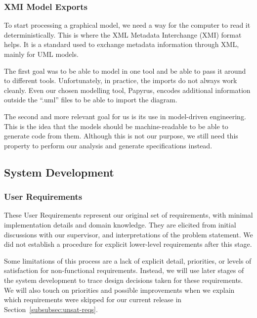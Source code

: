 \subsubsection{XMI Model Exports}
To start processing a graphical model, we need a way for the computer to read it deterministically.
This is where the XML Metadata Interchange (XMI) format helps.
It is a standard used to exchange metadata information through XML, mainly for UML models.

The first goal was to be able to model in one tool and be able to pass it around to different tools.
Unfortunately, in practice, the imports do not always work cleanly.
Even our chosen modelling tool, Papyrus, encodes additional information outside the ``.uml'' files to be able to import the diagram.

The second and more relevant goal for us is its use in model-driven engineering.
This is the idea that the models should be machine-readable to be able to generate code from them.
Although this is not our purpose, we still need this property to perform our analysis and generate specifications instead.

\subsection{System Development}
\label{subsec:system-development}
\subsubsection{User Requirements}\label{subsubsec:user-reqs}

These User Requirements represent our original set of requirements, with minimal implementation details and domain knowledge.
They are elicited from initial discussions with our supervisor,
and interpretations of the problem statement.
We did not establish a procedure for explicit lower-level requirements after this stage.

Some limitations of this process are a lack of explicit detail, priorities, or levels of satisfaction for non-functional requirements.
Instead, we will use later stages of the system development to trace design decisions taken for these requirements.
We will also touch on priorities and possible improvements when we explain
which requirements were skipped for our current release in Section~\ref{subsubsec:unsat-reqs}.

